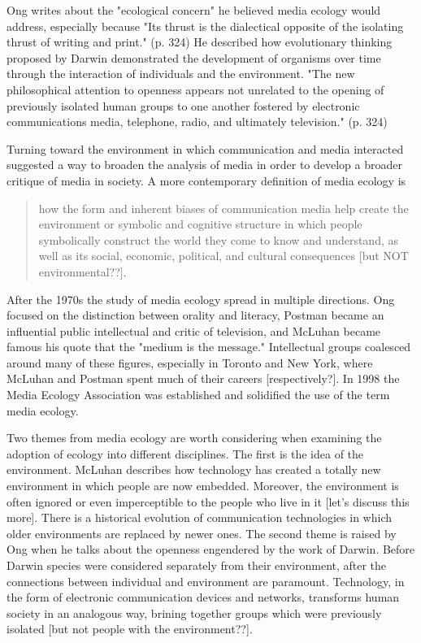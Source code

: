 Ong writes about the "ecological concern" he believed media ecology would address, especially because "Its thrust is the dialectical opposite of the isolating thrust of writing and print." (p. 324) He described how evolutionary thinking proposed by Darwin demonstrated the development of organisms over time through the interaction of individuals and the environment. "The new philosophical attention to openness appears not unrelated to the opening of previously isolated human groups to one another fostered by electronic communications media, telephone, radio,
and ultimately television."\citep{ong_interfaces_1977} (p. 324)

Turning toward the environment in which communication and media interacted suggested a way to broaden the analysis of media in order to develop a broader critique of media in society. A more contemporary definition of media ecology is

\begin{quote}
how the form and inherent biases of communication media help create the environment or symbolic and cognitive structure in which people symbolically construct the world they come to know and understand, as well as its social, economic, political, and cultural consequences [but NOT environmental??]. \citep{lum_introduction:_2000}
\end{quote}

After the 1970s the study of media ecology spread in multiple directions. Ong focused on the distinction between orality and literacy, Postman became an influential public intellectual and critic of television, and McLuhan became famous his quote that the "medium is the message." Intellectual groups coalesced around many of these figures, especially in Toronto and New York, where McLuhan and Postman spent much of their careers [respectively?]. In 1998 the Media Ecology Association was established and solidified the use of the term media ecology. 

Two themes from media ecology are worth considering when examining the adoption of ecology into different disciplines. The first is the idea of the environment. McLuhan describes how technology has created a totally new environment in which people are now embedded. Moreover, the environment is often ignored or even imperceptible to the people who live in it [let's discuss this more]. There is a historical evolution of communication technologies in which older environments are replaced by newer ones. The second theme is raised by Ong when he talks about the openness engendered by the work of Darwin. Before Darwin species were considered separately from their environment, after the connections between individual and environment are paramount. Technology, in the form of electronic communication devices and networks, transforms human society in an analogous way, brining together groups which were previously isolated [but not people with the environment??].

